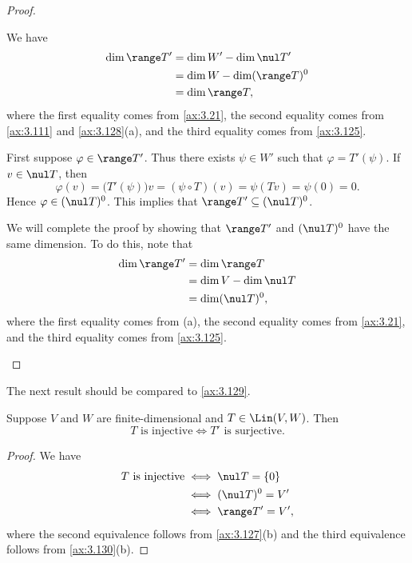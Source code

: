 \begin{proof}\leavevmode
\begin{parts}
\item We have
  \begin{align*}
  \dim\range T' &= \dim W'-\dim\nul T'\\
                &= \dim W-\dim(\range T)^0\\
                &= \dim\range T,
  \end{align*}
  where the first equality comes from \ref{ax:3.21}, the second equality comes
  from \ref{ax:3.111} and \ref{ax:3.128}(a), and the third equality comes from
  \ref{ax:3.125}.
\item First suppose $\varphi\in\range T'$. Thus there exists $\psi\in W'$ such
  that $\varphi=T'(\psi)$. If $v\in\nul T$, then
  \[ \varphi(v) = \bigl(T'(\psi)\bigr)v = (\psi\circ T)(v) = \psi(Tv)
     = \psi(0) = 0. \]
  Hence $\varphi\in(\nul T)^0$. This implies that $\range T'\subseteq(\nul T)^0$.

  We will complete the proof by showing that $\range T'$ and $(\nul T)^0$ have
  the same dimension. To do this, note that
  \begin{align*}
  \dim\range T' &= \dim\range T\\
                &= \dim V-\dim\nul T\\
                &= \dim(\nul T)^0,
  \end{align*}
  where the first equality comes from (a), the second equality comes from
  \ref{ax:3.21}, and the third equality comes from \ref{ax:3.125}. \qedhere
\end{parts}
\end{proof}

The next result should be compared to \ref{ax:3.129}.

\begin{result}\label{ax:3.131}
Suppose $V$ and $W$ are finite-dimensional and $T\in\Lin(V,W)$. Then
\[ T \text{ is injective} \iff T' \text{ is surjective}. \]
\end{result}

\begin{proof}
We have
\begin{align*}
T\text{ is injective} &\iff \nul T=\{0\}\\
  &\iff (\nul T)^0=V'\\
  &\iff \range T'=V',
\end{align*}
where the second equivalence follows from \ref{ax:3.127}(b) and the third
equivalence follows from \ref{ax:3.130}(b).
\end{proof}

